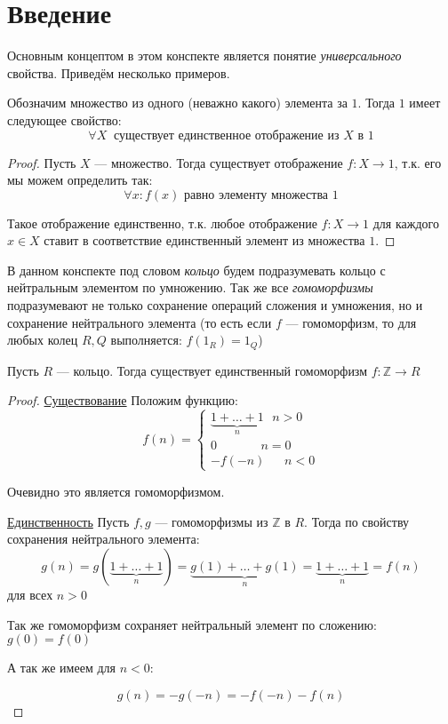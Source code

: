 \documentclass[document]{subfiles}
\begin{document}
\chapter{Введение}
Основным концептом в этом конспекте является понятие \textit{универсального} свойства. Приведём несколько примеров.

\begin{example}
	Обозначим множество из одного (неважно какого) элемента за $1$. Тогда $1$ имеет следующее свойство:
	\[\forall X ~ \text{ существует единственное отображение из } X \text{ в } 1\]
\end{example}

\begin{proof}
	Пусть $X$ --- множество. Тогда существует отображение $f: X \to 1$, т.к. его мы можем определить так:
	\[\forall x : f(x) \text{ равно элементу множества } 1\]

	Такое отображение единственно, т.к. любое отображение $f: X \to 1$ для каждого $x \in X$ ставит в соответствие единственный элемент из множества $1$.
\end{proof}
В данном конспекте под словом \textit{кольцо} будем подразумевать кольцо с нейтральным элементом по умножению. 
Так же все \textit{гомоморфизмы} подразумевают не только сохранение операций сложения и умножения, но и сохранение нейтрального элемента (то есть если $f$ --- гомоморфизм, то для любых колец $R, Q$ выполняется: $f(1_R) = 1_Q$)

\begin{example}
    Пусть $R$ --- кольцо. Тогда существует единственный гомоморфизм $f: \mathbb{Z} \to R$
\end{example}

\begin{proof}

    \underline{Существование}
    Положим функцию:
    \[f(n) = \begin{cases} \underbrace{1 + \dots + 1}_n ~~~ n > 0 \\ 0 ~~~~~~~~~~~~~~~~ n = 0 \\ -f(-n) ~~~~~~~ n < 0\end{cases}\]

    Очевидно это является гомоморфизмом.

    \underline{Единственность}
    Пусть $f, g$ --- гомоморфизмы из $\mathbb{Z}$ в $R$. Тогда по свойству сохранения нейтрального элемента:
    \[g(n) = g(\underbrace{1 + \dots + 1}_n) = \underbrace{g(1) + \dots + g(1)}_n = \underbrace{1 + \dots + 1}_n = f(n)\]
    для всех $n > 0$

    Так же гомоморфизм сохраняет нейтральный элемент по сложению: $g(0) = f(0)$

    А так же имеем для $n < 0$:

    \[g(n) = -g(-n) = -f(-n) - f(n)\]

\end{proof}
\end{document}
